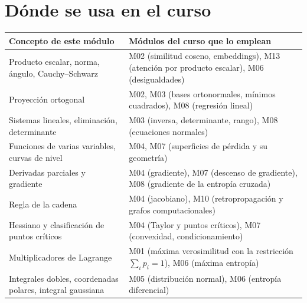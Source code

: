\documentclass[11pt,a4paper,twoside,openany]{book}
\begin{document}
\section*{Dónde se usa en el curso}
\begin{center}\small
\begin{tabularx}{\textwidth}{@{}>{\raggedright\arraybackslash}p{5.2cm}>{\raggedright\arraybackslash}X@{}}
\toprule
Concepto de este módulo & Módulos del curso que lo emplean \\
\midrule
Producto escalar, norma, ángulo, Cauchy--Schwarz & M02 (similitud coseno, embeddings), M13 (atención por producto escalar), M06 (desigualdades) \\
Proyección ortogonal & M02, M03 (bases ortonormales, mínimos cuadrados), M08 (regresión lineal) \\
Sistemas lineales, eliminación, determinante & M03 (inversa, determinante, rango), M08 (ecuaciones normales) \\
Funciones de varias variables, curvas de nivel & M04, M07 (superficies de pérdida y su geometría) \\
Derivadas parciales y gradiente & M04 (gradiente), M07 (descenso de gradiente), M08 (gradiente de la entropía cruzada) \\
Regla de la cadena & M04 (jacobiano), M10 (retropropagación y grafos computacionales) \\
Hessiano y clasificación de puntos críticos & M04 (Taylor y puntos críticos), M07 (convexidad, condicionamiento) \\
Multiplicadores de Lagrange & M01 (máxima verosimilitud con la restricción $\sum_i p_i=1$), M06 (máxima entropía) \\
Integrales dobles, coordenadas polares, integral gaussiana & M05 (distribución normal), M06 (entropía diferencial) \\
\bottomrule
\end{tabularx}
\end{center}
\end{document}
